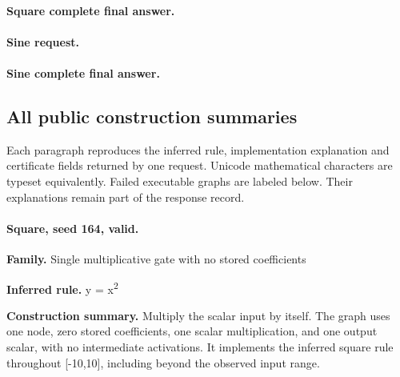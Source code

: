 

\paragraph{Square complete final answer.}



\paragraph{Sine request.}



\paragraph{Sine complete final answer.}



\subsection{All public construction summaries}\label{app:architecture_summaries}

Each paragraph reproduces the inferred rule, implementation explanation and certificate fields returned by one request. Unicode mathematical characters are typeset equivalently. Failed executable graphs are labeled below. Their explanations remain part of the response record.

\paragraph{Square, seed 164, valid.}

\textbf{Family.} Single multiplicative gate with no stored coefficients


\textbf{Inferred rule.} y = x\textsuperscript{2}


\textbf{Construction summary.} Multiply the scalar input by itself. The graph uses one node, zero stored coefficients, one scalar multiplication, and one output scalar, with no intermediate activations. It implements the inferred square rule throughout [-10,10], including beyond the observed input range.


